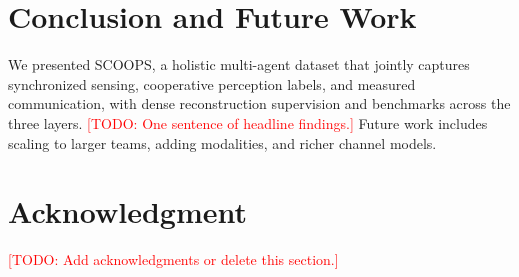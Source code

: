 \documentclass[conference]{IEEEtran}
\newcommand{\todo}[1]{\textcolor{red}{[TODO: #1]}}
\begin{document}
\section{Conclusion and Future Work}
\label{sec:conclusion}
We presented SCOOPS, a holistic multi-agent dataset that jointly captures
synchronized sensing, cooperative perception labels, and measured
communication, with dense reconstruction supervision and benchmarks across
the three layers. \todo{One sentence of headline findings.} Future work
includes scaling to larger teams, adding modalities, and richer channel
models.

\section*{Acknowledgment}
\todo{Add acknowledgments or delete this section.}



\end{document}
